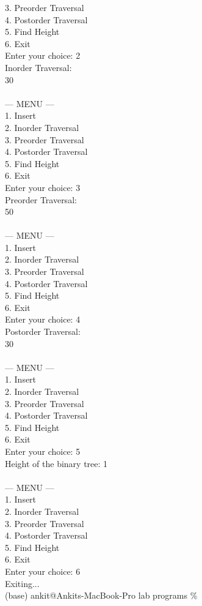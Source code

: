 \documentclass[12pt,a4paper]{article}
\begin{document}
\begin{tcolorbox}[terminalstyle, title=Sample Output]
{3. Preorder Traversal\\
4. Postorder Traversal\\
5. Find Height\\
6. Exit\\
Enter your choice: 2\\
Inorder Traversal:\\
30  \\
\\
--- MENU ---\\
1. Insert\\
2. Inorder Traversal\\
3. Preorder Traversal\\
4. Postorder Traversal\\
5. Find Height\\
6. Exit\\
Enter your choice: 3\\
Preorder Traversal:\\
50  \\
\\
--- MENU ---\\
1. Insert\\
2. Inorder Traversal\\
3. Preorder Traversal\\
4. Postorder Traversal\\
5. Find Height\\
6. Exit\\
Enter your choice: 4\\
Postorder Traversal:\\
30  \\
\\
--- MENU ---\\
1. Insert\\
2. Inorder Traversal\\
3. Preorder Traversal\\
4. Postorder Traversal\\
5. Find Height\\
6. Exit\\
Enter your choice: 5\\
Height of the binary tree: 1\\
\\
--- MENU ---\\
1. Insert\\
2. Inorder Traversal\\
3. Preorder Traversal\\
4. Postorder Traversal\\
5. Find Height\\
6. Exit\\
Enter your choice: 6\\
Exiting...\\
(base) ankit@Ankits-MacBook-Pro lab programs \%
}
\end{tcolorbox}
\end{document}
